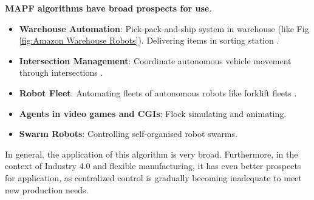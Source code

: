 \textbf{MAPF algorithms have broad prospects for use}.
\begin{itemize}
    \item \textbf{Warehouse Automation}: Pick-pack-and-ship system in warehouse (like Fig \ref{fig:Amazon Warehouse Robots}). Delivering items in sorting station \cite{Warehouse_Automation1,Warehouse_Automation2}.
    \item \textbf{Intersection Management}: Coordinate autonomous vehicle movement through intersections \cite{Intersection_Management}.
    \item \textbf{Robot Fleet}: Automating fleets of autonomous robots like forklift fleets \cite{Fork_Fleet1,Fork_Fleet2}.  
    \item \textbf{Agents in video games and CGIs}: Flock simulating and animating\cite{Flocking_1,Flocking_2}.
    \item \textbf{Swarm Robots}: Controlling self-organised robot swarms\cite{Swarm_Robotics}.
\end{itemize}

In general, the application of this algorithm is very broad. Furthermore, in the context of Industry 4.0 and flexible manufacturing, it has even better prospects for application\cite{Industry_41,Industry_42,Industry_43}, as centralized control is gradually becoming inadequate to meet new production needs.
 